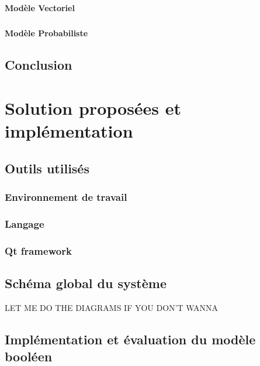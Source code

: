 \documentclass[12pt]{report}
\begin{document}
			\paragraph{}
			
			\subsubsection{Modèle Vectoriel}
			\paragraph{}
			
			\subsubsection{Modèle Probabiliste}
			\paragraph{}
		
	\section{Conclusion}
	
\chapter{Solution proposées et implémentation}
	\section{Outils utilisés}
		\subsection{Environnement de travail}
		\subsection{Langage}
		\subsection{Qt framework}
		
	\section{Schéma global du système}
	LET ME DO THE DIAGRAMS IF YOU DON'T WANNA
	
	\section{Implémentation et évaluation du modèle booléen}
	
\end{document}
